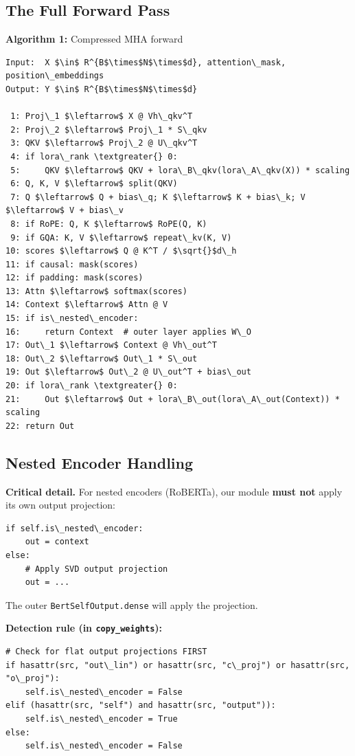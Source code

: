 \subsection{The Full Forward Pass}

\textbf{Algorithm 1:} Compressed MHA forward
\begin{lstlisting}
Input:  X $\in$ R^{B$\times$N$\times$d}, attention\_mask, position\_embeddings
Output: Y $\in$ R^{B$\times$N$\times$d}

 1: Proj\_1 $\leftarrow$ X @ Vh\_qkv^T
 2: Proj\_2 $\leftarrow$ Proj\_1 * S\_qkv
 3: QKV $\leftarrow$ Proj\_2 @ U\_qkv^T
 4: if lora\_rank \textgreater{} 0:
 5:     QKV $\leftarrow$ QKV + lora\_B\_qkv(lora\_A\_qkv(X)) * scaling
 6: Q, K, V $\leftarrow$ split(QKV)
 7: Q $\leftarrow$ Q + bias\_q; K $\leftarrow$ K + bias\_k; V $\leftarrow$ V + bias\_v
 8: if RoPE: Q, K $\leftarrow$ RoPE(Q, K)
 9: if GQA: K, V $\leftarrow$ repeat\_kv(K, V)
10: scores $\leftarrow$ Q @ K^T / $\sqrt{}$d\_h
11: if causal: mask(scores)
12: if padding: mask(scores)
13: Attn $\leftarrow$ softmax(scores)
14: Context $\leftarrow$ Attn @ V
15: if is\_nested\_encoder:
16:     return Context  # outer layer applies W\_O
17: Out\_1 $\leftarrow$ Context @ Vh\_out^T
18: Out\_2 $\leftarrow$ Out\_1 * S\_out
19: Out $\leftarrow$ Out\_2 @ U\_out^T + bias\_out
20: if lora\_rank \textgreater{} 0:
21:     Out $\leftarrow$ Out + lora\_B\_out(lora\_A\_out(Context)) * scaling
22: return Out
\end{lstlisting}

\subsection{Nested Encoder Handling}

\textbf{Critical detail.} For nested encoders (RoBERTa), our module \textbf{must not} 
apply its own output projection:

\begin{lstlisting}
if self.is\_nested\_encoder:
    out = context
else:
    # Apply SVD output projection
    out = ...
\end{lstlisting}

The outer \texttt{BertSelfOutput.dense} will apply the projection.

\textbf{Detection rule (in \texttt{copy\_weights}):}

\begin{lstlisting}
# Check for flat output projections FIRST
if hasattr(src, "out\_lin") or hasattr(src, "c\_proj") or hasattr(src, "o\_proj"):
    self.is\_nested\_encoder = False
elif (hasattr(src, "self") and hasattr(src, "output")):
    self.is\_nested\_encoder = True
else:
    self.is\_nested\_encoder = False
\end{lstlisting}

